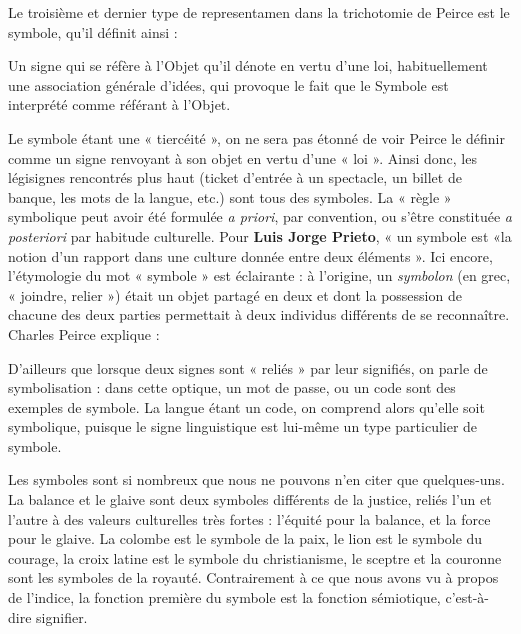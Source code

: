 Le troisième et dernier type de representamen dans la trichotomie de Peirce est le symbole, qu’il définit ainsi :
\begin{lecture}{}
Un signe qui se réfère à l’Objet qu’il dénote en vertu d’une loi, habituellement une association générale d’idées, qui provoque le fait que le Symbole est interprété comme référant à l’Objet.
\end{lecture}
Le symbole étant une « tiercéité », on ne sera pas étonné de voir Peirce le définir comme un signe renvoyant à son objet en vertu d’une « loi ». Ainsi donc, les légisignes rencontrés plus haut (ticket d’entrée à un spectacle, un billet de banque, les mots de la langue, etc.) sont tous des symboles. La « règle » symbolique peut avoir été formulée \textit{a priori}, par convention, ou s’être constituée \textit{a posteriori} par habitude culturelle. Pour \textbf{Luis Jorge Prieto}, « un symbole est «la notion d’un rapport dans une culture donnée entre deux éléments ». Ici encore, l’étymologie du mot « symbole » est éclairante : à l’origine, un \textit{symbolon} (en grec, « joindre, relier ») était un objet partagé en deux et dont la possession de chacune des deux parties permettait à deux individus différents de se reconnaître. Charles Peirce explique :

D’ailleurs que lorsque deux signes sont « reliés » par leur signifiés, on parle de symbolisation : dans cette optique, un mot de passe, ou un code sont des exemples de symbole. La langue étant un code, on comprend alors qu’elle soit symbolique, puisque le signe linguistique est lui-même un type particulier de symbole.

Les symboles sont si nombreux que nous ne pouvons n’en citer que quelques-uns. La balance et le glaive sont deux symboles différents de la justice, reliés l’un et l’autre à des valeurs culturelles très fortes : l’équité pour la balance, et la force pour le glaive. La colombe est le symbole de la paix, le lion est le symbole du courage, la croix latine est le symbole du christianisme, le sceptre et la couronne sont les symboles de la royauté. Contrairement à ce que nous avons vu à propos de l’indice, la fonction première du symbole est la fonction sémiotique, c’est-à-dire signifier.


